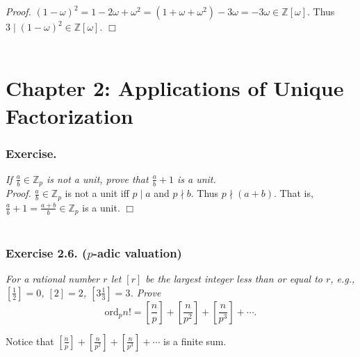 \documentclass{article}
\begin{document}
\emph{Proof.}
$(1 - \omega)^2
= 1 - 2\omega + \omega^2
= (1 + \omega + \omega^2) - 3 \omega
= - 3 \omega \in \mathbb{Z}[\omega]$.
Thus $3 \mid (1 - \omega)^2 \in \mathbb{Z}[\omega]$.
$\Box$ \\\\






\newpage
\section*{Chapter 2: Applications of Unique Factorization \\}



\subsubsection*{Exercise.}
\emph{If $\frac{a}{b} \in \mathbb{Z}_{p}$ is not a unit, prove that
$\frac{a}{b} + 1$ is a unit.} \\

\emph{Proof.}
$\frac{a}{b} \in \mathbb{Z}_{p}$ is not a unit iff $p \mid a$ and $p \nmid b$.
Thus $p \nmid (a +b)$. That is, $\frac{a}{b} + 1 = \frac{a + b}{b} \in \mathbb{Z}_{p}$ is a unit.
$\Box$ \\\\






\subsubsection*{Exercise 2.6. ($p$-adic valuation)}
\emph{For a rational number $r$ let $[r]$ be the largest integer less than or equal to $r$,
e.g., $[\frac{1}{2}] = 0$, $[2] = 2$, $[3 \frac{1}{3}] = 3$. Prove
$$\text{ord}_p n!
= \left[\frac{n}{p}\right] + \left[\frac{n}{p^2}\right] + \left[\frac{n}{p^3}\right] + \cdots.$$
}

Notice that $[\frac{n}{p}] + [\frac{n}{p^2}] + [\frac{n}{p^3}] + \cdots$ is a finite sum. \\
\end{document}
